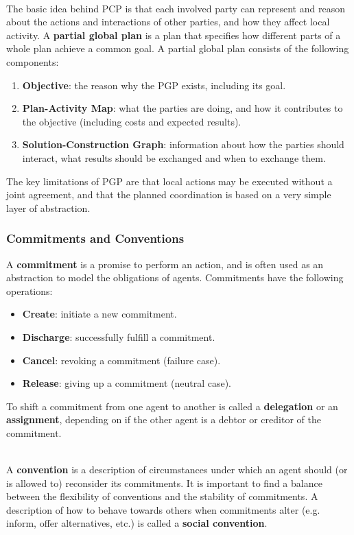 \documentclass[12pt]{article}
\begin{document}
\noindent
\\
The basic idea behind PCP is that each involved party can represent and reason about the actions and interactions of other parties, and how they affect local activity.
A \textbf{partial global plan} is a plan that specifies how different parts of a whole plan achieve a common goal.
A partial global plan consists of the following components:

\begin{enumerate}
    \item \textbf{Objective}: the reason why the PGP exists, including its goal.
    \item \textbf{Plan-Activity Map}: what the parties are doing, and how it contributes to the objective (including costs and expected results).
    \item \textbf{Solution-Construction Graph}: information about how the parties should interact, what results should be exchanged and when to exchange them.
\end{enumerate}

\noindent
The key limitations of PGP are that local actions may be executed without a joint agreement, and that the planned coordination is based on a very simple layer of abstraction.

\subsubsection{Commitments and Conventions}
A \textbf{commitment} is a promise to perform an action, and is often used as an abstraction to model the obligations of agents.
Commitments have the following operations:

\begin{itemize}
    \item \textbf{Create}: initiate a new commitment.
    \item \textbf{Discharge}: successfully fulfill a commitment.
    \item \textbf{Cancel}: revoking a commitment (failure case).
    \item \textbf{Release}: giving up a commitment (neutral case).
\end{itemize}

\noindent
To shift a commitment from one agent to another is called a \textbf{delegation} or an \textbf{assignment}, depending on if the other agent is a debtor or creditor of the commitment.

\noindent
\\
A \textbf{convention} is a description of circumstances under which an agent should (or is allowed to) reconsider its commitments.
It is important to find a balance between the flexibility of conventions and the stability of commitments.
A description of how to behave towards others when commitments alter (e.g. inform, offer alternatives, etc.) is called a \textbf{social convention}.
\end{document}
